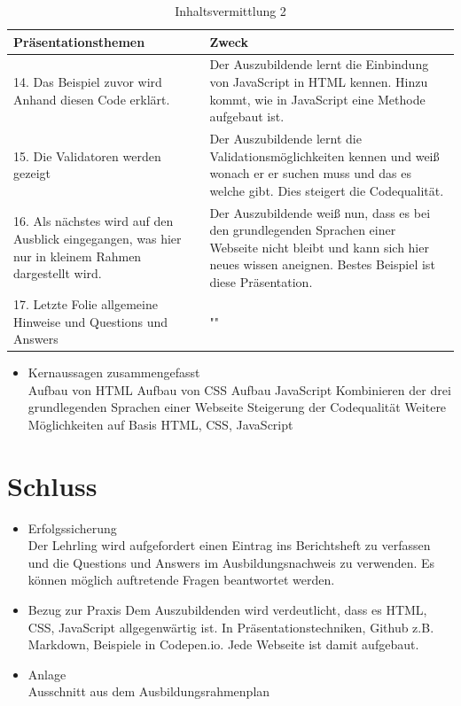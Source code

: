 \documentclass[a4paper, 12pt]{article}
\begin{document}
\newpage
\begin{table}[h!]
	\begin{center}
		\caption{Inhaltsvermittlung 2}
		\label{tab:table1}
		\begin{tabular}{|p{8cm}|p{8cm}|}
			\textbf{Präsentationsthemen} & \textbf{Zweck}\\
			\hline
			14. Das Beispiel zuvor wird Anhand diesen Code erklärt. & Der Auszubildende lernt die Einbindung von JavaScript in HTML kennen. Hinzu kommt, wie in JavaScript eine Methode aufgebaut ist.\\
			\hline
			15. Die Validatoren werden gezeigt & Der Auszubildende lernt die Validationsmöglichkeiten kennen und weiß wonach er er suchen muss und das es welche gibt. Dies steigert die Codequalität.\\
			\hline
			16. Als nächstes wird auf den Ausblick eingegangen, was hier nur in kleinem Rahmen dargestellt wird. & Der Auszubildende weiß nun, dass es bei den grundlegenden Sprachen einer Webseite nicht bleibt und kann sich hier neues wissen aneignen. Bestes Beispiel ist diese Präsentation.\\
			\hline
			17. Letzte Folie allgemeine Hinweise und Questions und Answers & ""\\
			\hline
		\end{tabular}
	\end{center}
\end{table}

\begin{itemize}
	\item Kernaussagen zusammengefasst\\
	\subitem Aufbau von HTML
	\subitem Aufbau von CSS
	\subitem Aufbau JavaScript
	\subitem Kombinieren der drei grundlegenden Sprachen einer Webseite
	\subitem Steigerung der Codequalität
	\subitem Weitere Möglichkeiten auf Basis HTML, CSS, JavaScript
\end{itemize}

\section{Schluss}
	\begin{itemize}
		\item Erfolgssicherung\\
		Der Lehrling wird aufgefordert einen Eintrag ins Berichtsheft zu verfassen und die Questions und Answers im Ausbildungsnachweis zu verwenden. Es können möglich auftretende Fragen beantwortet werden.
		\item Bezug zur Praxis
		Dem Auszubildenden wird verdeutlicht, dass es HTML, CSS, JavaScript allgegenwärtig ist. In Präsentationstechniken, Github z.B. Markdown, Beispiele in Codepen.io. Jede Webseite ist damit aufgebaut.
		\item Anlage\\
		Ausschnitt aus dem Ausbildungsrahmenplan
	\end{itemize}
\newpage
\end{document}
